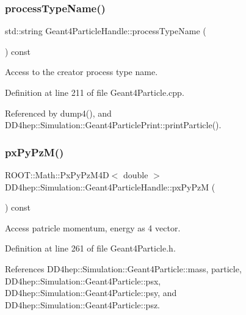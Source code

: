 \subsubsection{\texorpdfstring{process\+Type\+Name()}{processTypeName()}}
{\footnotesize\ttfamily std\+::string Geant4\+Particle\+Handle\+::process\+Type\+Name (\begin{DoxyParamCaption}{ }\end{DoxyParamCaption}) const}



Access to the creator process type name. 



Definition at line 211 of file Geant4\+Particle.\+cpp.



Referenced by dump4(), and D\+D4hep\+::\+Simulation\+::\+Geant4\+Particle\+Print\+::print\+Particle().

\hypertarget{class_d_d4hep_1_1_simulation_1_1_geant4_particle_handle_a8611e41b19321562910d1003ad7843cc}{}\label{class_d_d4hep_1_1_simulation_1_1_geant4_particle_handle_a8611e41b19321562910d1003ad7843cc} 
\subsubsection{\texorpdfstring{px\+Py\+Pz\+M()}{pxPyPzM()}}
{\footnotesize\ttfamily R\+O\+O\+T\+::\+Math\+::\+Px\+Py\+Pz\+M4D$<$ double $>$ D\+D4hep\+::\+Simulation\+::\+Geant4\+Particle\+Handle\+::px\+Py\+PzM (\begin{DoxyParamCaption}{ }\end{DoxyParamCaption}) const\hspace{0.3cm}{\ttfamily [inline]}}



Access patricle momentum, energy as 4 vector. 



Definition at line 261 of file Geant4\+Particle.\+h.



References D\+D4hep\+::\+Simulation\+::\+Geant4\+Particle\+::mass, particle, D\+D4hep\+::\+Simulation\+::\+Geant4\+Particle\+::psx, D\+D4hep\+::\+Simulation\+::\+Geant4\+Particle\+::psy, and D\+D4hep\+::\+Simulation\+::\+Geant4\+Particle\+::psz.

